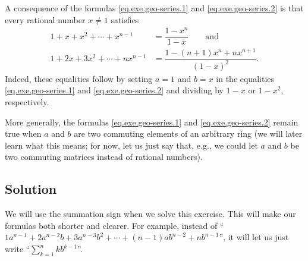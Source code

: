 \documentclass[paper=a4, fontsize=12pt]{scrartcl} %
\newcommand{\tup}[1]{\left( #1 \right)}
\let\sumnonlimits\sum
\renewcommand{\sum}{\sumnonlimits\limits}
\theoremstyle{plainsl}
\theoremstyle{definition}
\theoremstyle{remark}
\begin{document}
A consequence of the formulas
\eqref{eq.exe.geo-series.1} and \eqref{eq.exe.geo-series.2}
is that every rational number $x \neq 1$ satisfies
\begin{align*}
1 + x + x^2 + \cdots + x^{n-1} &= \dfrac{1 - x^n}{1 - x}
\qquad
\text{and} \\
1 + 2 x + 3 x^2 + \cdots + n x^{n-1}
&= \dfrac{1 - \tup{n+1} x^n + n x^{n+1}}{\tup{1 - x}^2} .
\end{align*}
Indeed, these equalities follow by setting $a = 1$ and $b = x$
in the equalities
\eqref{eq.exe.geo-series.1} and \eqref{eq.exe.geo-series.2}
and dividing by $1-x$ or $1-x^2$, respectively.

More generally, the formulas
\eqref{eq.exe.geo-series.1} and \eqref{eq.exe.geo-series.2}
remain true when $a$ and $b$ are two commuting elements of an
arbitrary ring
(we will later learn what this means; for now, let us
just say that, e.g., we could let $a$ and $b$ be two commuting
matrices instead of rational numbers).

\subsection{Solution}

We will use the summation sign when we solve this exercise.
This will make our formulas both shorter and clearer.
For example, instead of
``$1 a^{n-1} + 2 a^{n-2} b + 3 a^{n-3} b^2 + \cdots + \tup{n-1} a b^{n-2} + n b^{n-1}$'',
it will let us just write
``$\sum_{k=1}^n k b^{k-1}$''.
\end{document}
